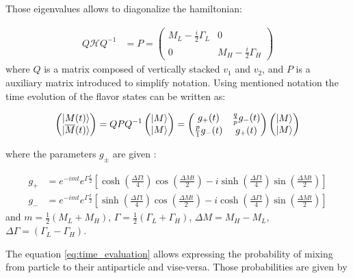 Those eigenvalues allows to diagonalize the hamiltonian: 

\begin{align}
   Q\mathcal{H}Q^{-1} &= P =  \left( \begin{matrix} M_{L} - \frac{i}{2}\Gamma_{L} & 0  \\ 0 &  M_{H} - \frac{i}{2}\Gamma_{H}  \end{matrix} \right) 
\end{align}
where $Q$ is a matrix composed of vertically stacked $v_1$ and $v_2$, and $P$ is a auxiliary matrix introduced to simplify notation. 
Using mentioned notation the time evolution of the flavor states can be written as:

\begin{align}
\label{eq:time_evaluation}
  \left(\begin{matrix} \lvert M(t)\rangle  \\ \lvert\overline{M}(t)\rangle \end{matrix}  \right) 
  = QPQ^{-1} \left(\begin{matrix} \lvert M\rangle  \\ \lvert M\rangle \end{matrix}  \right) 
  = \left(\begin{matrix} g_{+}(t) &  \frac{q}{p}g_{-}(t)  \\  \frac{p}{1}g_{-}(t)  & g_{+}(t)  \end{matrix}\right) 
  \left(\begin{matrix} \lvert M\rangle  \\ \lvert M\rangle \end{matrix}  \right)   
\end{align}

where the parameters $g_{\pm}$ are given :

\begin{align}
    g_{+} &= e^{-imt}e^{\Gamma \frac{t}{2}} \left[ \cosh(\frac{\Delta \Gamma t}{4})\cos(\frac{\Delta M t}{2})  - i\sinh(\frac{\Delta \Gamma t}{4})\sin(\frac{\Delta M t}{2})  \right] \\ 
    g_{-} &= e^{-imt}e^{\Gamma \frac{t}{2}} \left[ \sinh(\frac{\Delta \Gamma t}{4})\cos(\frac{\Delta M t}{2})  - i\cosh(\frac{\Delta \Gamma t}{4})\sin(\frac{\Delta M t}{2})  \right]   
\end{align}
and $m = \frac{1}{2}(M_{L}+M_H)$, $\Gamma =  \frac{1}{2}(\Gamma_{L}+\Gamma_{H})$, $\Delta M = M_{H}- M_{L}$, $ \Delta \Gamma =(\Gamma_{L}-\Gamma_{H})$.

The equation \ref{eq:time_evaluation} allows expressing the probability of mixing from particle to their antiparticle and vise-versa. Those probabilities are given by 


